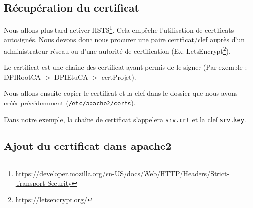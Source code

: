 %  
%  



\subsection{Récupération du certificat}
Nous allons plus tard activer HSTS\footnote{\url{https://developer.mozilla.org/en-US/docs/Web/HTTP/Headers/Strict-Transport-Security}}. Cela empêche l'utilisation de certificats autosignés. Nous devons donc nous procurer une paire certificat/clef auprès d'un administrateur réseau ou d'une autorité de certification (Ex: LetsEncrypt\footnote{\url{https://letsencrypt.org/}}).

Le certificat est une chaîne des certificat ayant permis de le signer (Par exemple : DPIRootCA $>$ DPIEtuCA $>$ certProjet). 

Nous allons ensuite copier le certificat et la clef dans le dossier que nous avons créés précédemment (\texttt{/etc/apache2/certs}).

Dans notre exemple, la chaîne de certificat s'appelera \texttt{srv.crt} et la clef \texttt{srv.key}.

\subsection{Ajout du certificat dans apache2}

